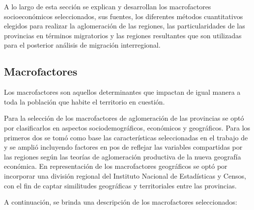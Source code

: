 \documentclass[12pt,a4paper]{article}
\begin{document}
A lo largo de esta sección se explican y desarrollan los macrofactores socioeconómicos seleccionados, sus fuentes, los diferentes métodos cuantitativos elegidos para realizar la aglomeración de las regiones, las particularidades de las provincias en términos migratorios y las regiones resultantes que son utilizadas para el posterior análisis de migración interregional. 

\subsection{Macrofactores}

Los macrofactores son aquellos determinantes que impactan de igual manera a toda la población que habite el territorio en cuestión.

Para la selección de los macrofactores de aglomeración de las provincias se optó por clasificarlos en aspectos sociodemográficos, económicos y geográficos. Para los primeros dos se tomó como base las características seleccionadas en el trabajo de \textcite{cicowiez_caracterizacion_2003} y se amplió incluyendo factores en pos de reflejar las variables compartidas por las regiones según las teorías de aglomeración productiva de la nueva geografía económica. En representación de los macrofactores geográficos se optó por incorporar una división regional del Instituto Nacional de Estadísticas y Censos, con el fin de captar similitudes geográficas y territoriales entre las provincias.

A continuación, se brinda una descripción de los macrofactores seleccionados:
\end{document}
